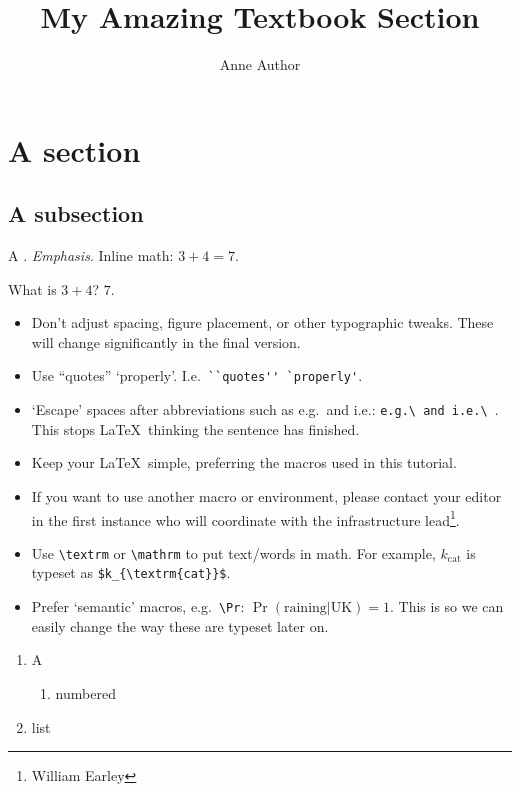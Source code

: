 \title{My Amazing Textbook Section}
\author{Anne Author}
\maketitle

\section{A section}
\subsection{A subsection}

A .
\emph{Emphasis}.
Inline math: $3 + 4 = 7$.

\begin{popquiz}[label=pop:tut:addition]
  What is $3+4$?
\solution
  $7$.
\end{popquiz}


\begin{itemize}
    \item Don't adjust spacing, figure placement, or other typographic tweaks.
          These will change significantly in the final version.
    \item Use ``quotes'' `properly'. I.e.\ \verb|``quotes'' `properly'|.
    \item `Escape' spaces after abbreviations such as e.g.\ and i.e.: \verb|e.g.\ and i.e.\ |.
          This stops \LaTeX\ thinking the sentence has finished.
    \item Keep your \LaTeX\ simple, preferring the macros used in this tutorial.
    \item If you want to use another macro or environment, please contact your editor in the first instance who will coordinate with the infrastructure lead\footnote{William Earley}.
    \item Use \verb|\textrm| or \verb|\mathrm| to put text/words in math.
          For example, $k_{\textrm{cat}}$ is typeset as \verb|$k_{\textrm{cat}}$|.
    \item Prefer `semantic' macros, e.g.\ \verb|\Pr|: $\Pr(\textrm{raining} | \textrm{UK}) = 1$.
          This is so we can easily change the way these are typeset later on.
\end{itemize}

\begin{enumerate}
    \item A
    \begin{enumerate}
        \item numbered
    \end{enumerate}
    \item list
\end{enumerate}

